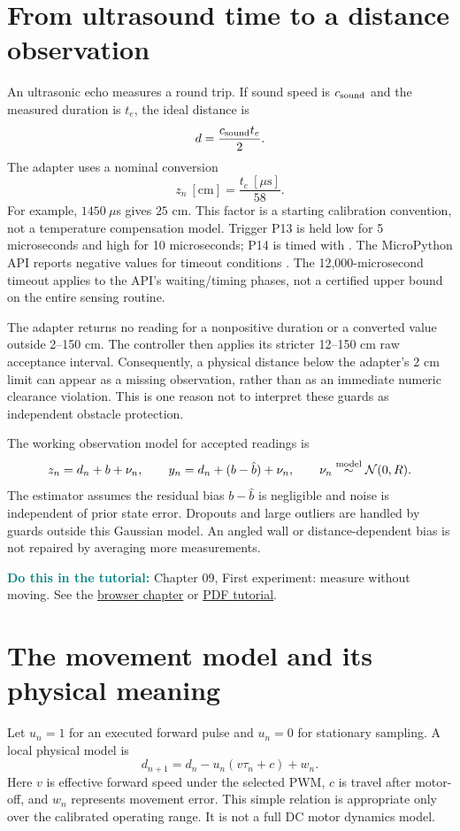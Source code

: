 \documentclass[11pt,a4paper]{article}
\newcommand{\code}[1]{\texttt{\detokenize{#1}}}
\newcommand{\tuto}[2]{\par\textcolor{teal}{\textbf{Do this in the tutorial:}} Chapter #1, #2. See the \href{Tutorial_A_to_Z.html\#t#1}{browser chapter} or \href{Tutorial_A_to_Z.pdf}{PDF tutorial}.\par}
\newcommand{\N}{\mathcal N}
\begin{document}
\section{From ultrasound time to a distance observation}
An ultrasonic echo measures a round trip. If sound speed is $c_{\rm sound}$ and the measured duration is $t_e$, the ideal distance is
\begin{equation}
 d=\frac{c_{\rm sound}t_e}{2}.
\end{equation}
The adapter uses a nominal conversion
\begin{equation}
 z_n\ [\mathrm{cm}]=\frac{t_e\ [\mu\mathrm{s}]}{58}.
\end{equation}
For example, $1450\ \mu$s gives $25$ cm. This factor is a starting calibration convention, not a temperature compensation model. Trigger P13 is held low for 5 microseconds and high for 10 microseconds; P14 is timed with \code{time_pulse_us(pin14,1,12000)}. The MicroPython API reports negative values for timeout conditions \cite{microbit}. The 12,000-microsecond timeout applies to the API's waiting/timing phases, not a certified upper bound on the entire sensing routine.

The adapter returns no reading for a nonpositive duration or a converted value outside 2--150 cm. The controller then applies its stricter 12--150 cm raw acceptance interval. Consequently, a physical distance below the adapter's 2 cm limit can appear as a missing observation, rather than as an immediate numeric clearance violation. This is one reason not to interpret these guards as independent obstacle protection.

The working observation model for accepted readings is
\begin{equation}\label{eq:obs}
 z_n=d_n+b+\nu_n,\qquad y_n=d_n+(b-\hat b)+\nu_n,
 \qquad \nu_n\overset{\rm model}{\sim}\N(0,R).
\end{equation}
The estimator assumes the residual bias $b-\hat b$ is negligible and noise is independent of prior state error. Dropouts and large outliers are handled by guards outside this Gaussian model. An angled wall or distance-dependent bias is not repaired by averaging more measurements.
\tuto{09}{First experiment: measure without moving}

\section{The movement model and its physical meaning}
Let $u_n=1$ for an executed forward pulse and $u_n=0$ for stationary sampling. A local physical model is
\begin{equation}\label{eq:dynamics}
 d_{n+1}=d_n-u_n(v\tau_n+c)+w_n.
\end{equation}
Here $v$ is effective forward speed under the selected PWM, $c$ is travel after motor-off, and $w_n$ represents movement error. This simple relation is appropriate only over the calibrated operating range. It is not a full DC motor dynamics model.
\end{document}
